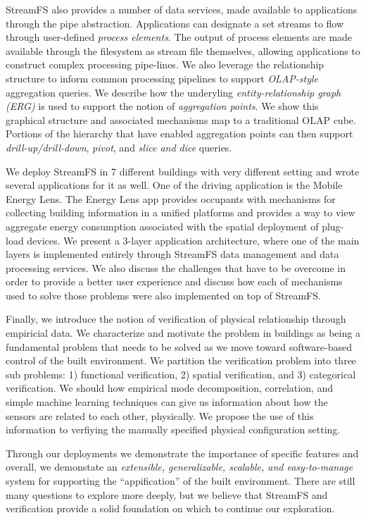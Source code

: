 \documentclass{ucbthesis}
\begin{document}
StreamFS also provides a number of data services, made available to applications through the pipe abstraction.  Applications can 
designate a set streams to flow through user-defined \emph{process elements}.  The output of process elements are made available
through the filesystem as stream file themselves, allowing applications to construct complex processing pipe-lines.
We also leverage the relationship structure to inform common processing pipelines to support \emph{OLAP-style} aggregation
queries.  We describe how the underyling \emph{entity-relationship graph (ERG)} is used to support the notion of \emph{aggregation points}.
We show this graphical structure and associated mechanisms map to a traditional OLAP cube.  Portions of the hierarchy that have 
enabled aggregation points can then support \emph{drill-up/drill-down}, \emph{pivot}, and \emph{slice and dice} queries.

We deploy StreamFS in 7 different buildings with very different setting and wrote several applications for it as well.  One of the driving
application is the Mobile Energy Lens.  The Energy Lens app provides occupants with mechanisms for collecting building information
in a unified platforms and provides a way to view aggregate energy consumption associated with the spatial deployment
of plug-load devices.  We present a 3-layer application architecture, where one of the main layers is implemented entirely through
StreamFS data management and data processing services.  We also discuss the challenges that have to be overcome in order to
provide a better user experience and discuss how each of mechanisms used to solve those problems were also implemented on top of StreamFS.

Finally, we introduce the notion of verification of physical relationship through empiricial data.  We characterize and motivate the problem
in buildings as being a fundamental problem that needs to be solved as we move toward software-based control of the built environment.
We partition the verification problem into three sub problems: 1) functional verification, 2) spatial verification, and 3) categorical
verification.  We should how empirical mode decomposition, correlation, and simple machine learning techniques can give us 
information about how the sensors are related to each other, physically.  We propose the use of this information to 
verfiying the manually specified physical configuration setting.

Through our deployments we demonstrate the importance of specific features and overall, we demonstate an \emph{extensible, generalizable,
scalable, and easy-to-manage} system for supporting the ``appification'' of the built environment.  There are still many
questions to explore more deeply, but we believe that StreamFS and verification provide a solid foundation on which to continue
our exploration.











\appendix


\printbibliography
\end{document}
